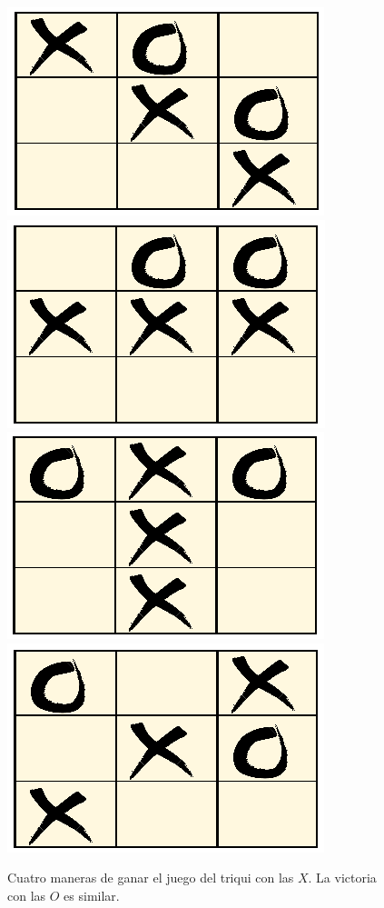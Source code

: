 \documentclass[11pt]{article}
\begin{document}
\begin{figure}
\begin{center}
\includegraphics[scale=.2]{imagenes/triqui1}\hspace{.5cm}
\includegraphics[scale=.2]{imagenes/triqui2}\hspace{.5cm}
\includegraphics[scale=.2]{imagenes/triqui3}\hspace{.5cm}
\includegraphics[scale=.2]{imagenes/triqui4}\hspace{.5cm}
\end{center}
\caption{Cuatro maneras de ganar el juego del triqui con las $X$. La victoria con las $O$ es similar.}\label{fig:triqui}
\end{figure}
\end{document}
